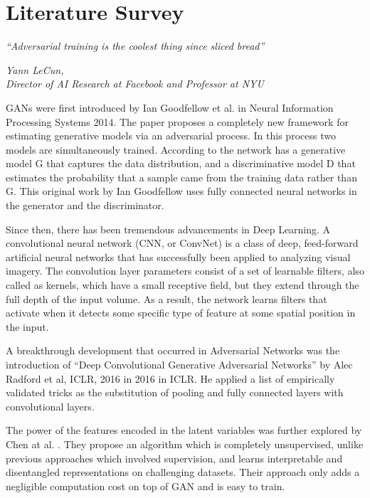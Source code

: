 \chapter{Literature Survey}\label{ch:literature_survey}
\epigraph{\textit{\Large “Adversarial training is the coolest thing since sliced bread”}}{\textit{ \large Yann LeCun,\\ Director of AI Research at Facebook and Professor at NYU}}


GANs were first introduced by Ian Goodfellow et al. \cite{gan} in Neural Information Processing Systems 2014. The paper proposes a completely new framework for estimating generative models via an adversarial process. In this process two models are simultaneously trained. According to \cite{gan} the network has a generative model G that captures the data distribution, and a discriminative model D that estimates the probability that a sample came from the training data rather than G. This original work by Ian Goodfellow uses fully connected neural networks in the generator and the discriminator. 
\par\bigskip


Since then, there has been tremendous advancements in Deep Learning. A convolutional neural network (CNN, or ConvNet) \cite{imagenet} is a class of deep, feed-forward artificial neural networks that has successfully been applied to analyzing visual imagery. The convolution layer parameters consist of a set of learnable filters, also called as kernels, which have a small receptive field, but they extend through the full depth of the input volume. As a result, the network learns filters that activate when it detects some specific type of feature at some spatial position in the input.
\par\bigskip

A breakthrough development that occurred in Adversarial Networks was the introduction of “Deep Convolutional Generative Adversarial Networks” by Alec Radford et al, ICLR, 2016 in 2016 in ICLR\cite{dcgan}. He applied a list of empirically validated tricks as the substitution of pooling and fully connected layers with convolutional layers.
\par\bigskip

The power of the features encoded in the latent variables was further explored by Chen at al. \cite{infogan}. They propose an algorithm which is completely unsupervised, unlike previous approaches which involved supervision, and learns interpretable and disentangled representations on challenging datasets. Their approach only adds a negligible computation cost on top of GAN and is easy to train.
\par\bigskip

